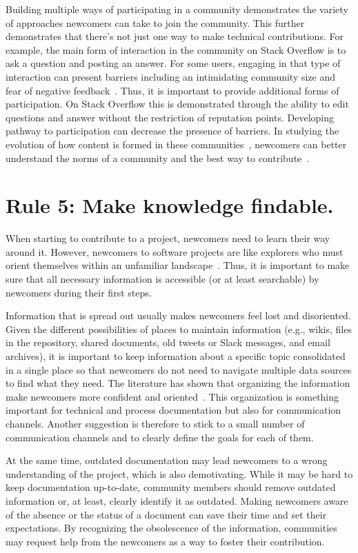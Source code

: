 \documentclass[10pt,letterpaper]{article}
\newcommand{\rulemajor}[1]{\section{#1}}
\begin{document}
Building multiple ways of participating in a community demonstrates the variety of approaches newcomers can take to join the community.
This further demonstrates that there’s not just one way to make technical contributions.
For example,
the main form of interaction in the community on Stack Overflow is to ask a question and posting an answer.
For some users, engaging in that type of interaction can present barriers including an intimidating community size and fear of negative feedback~\cite{ford2016}.
Thus, it is important to provide additional forms of participation.
On Stack Overflow this is demonstrated through the ability to edit questions and answer without the restriction of reputation points.
Developing pathway to participation can decrease the presence of barriers.
In studying the evolution of how content is formed in these communities~\cite{baltes2018},
newcomers can better understand the norms of a community and the best way to contribute~\cite{ford2018}.

\rulemajor{Rule 5: Make knowledge findable.}

When starting to contribute to a project,
newcomers need to learn their way around it.
However,
newcomers to software projects are like explorers who must orient themselves within an unfamiliar landscape~\cite{dagenais2010}.
Thus,
it is important to make sure that all necessary information is accessible
(or at least searchable)
by newcomers during their first steps.

Information that is spread out usually makes newcomers feel lost and disoriented.
Given the different possibilities of places to maintain information
(e.g., wikis, files in the repository, shared documents, old tweets or Slack messages, and email archives),
it is important to keep information about a specific topic consolidated in a single place
so that newcomers do not need to navigate multiple data sources to find what they need.
The literature has shown that organizing the information make newcomers more confident and oriented~\cite{steinmacher2016}.
This organization is something important for technical and process documentation but also for communication channels.
Another suggestion is therefore to stick to a small number of communication channels
and to clearly define the goals for each of them.

At the same time,
outdated documentation may lead newcomers to a wrong understanding of the project,
which is also demotivating.
While it may be hard to keep documentation up-to-date,
community members should remove outdated information or, at least, clearly identify it as outdated.
Making newcomers aware of the absence or the status of a document can save their time and set their expectations.
By recognizing the obsolescence of the information,
communities may request help from the newcomers as a way to foster their contribution.
\end{document}

